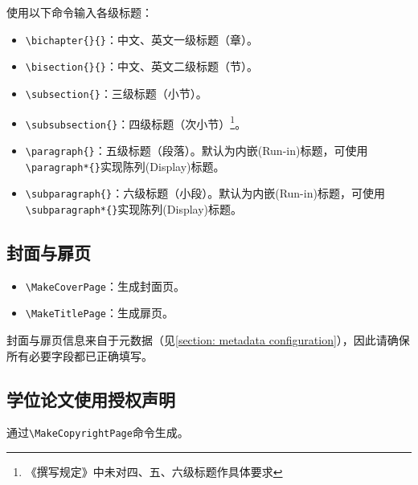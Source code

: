 使用以下命令输入各级标题：
\begin{itemize}[itemsep=2pt,topsep=5pt]
    \item \verb|\bichapter{}{}|：中文、英文一级标题（章）。
    \item \verb|\bisection{}{}|：中文、英文二级标题（节）。
    \item \verb|\subsection{}|：三级标题（小节）。
    \item \verb|\subsubsection{}|：四级标题（次小节）\footnote{《撰写规定》中未对四、五、六级标题作具体要求}。
    \item \verb|\paragraph{}|：五级标题（段落）。默认为内嵌(Run-in)标题，可使用\verb|\paragraph*{}|实现陈列(Display)标题。
    \item \verb|\subparagraph{}|：六级标题（小段）。默认为内嵌(Run-in)标题，可使用\verb|\subparagraph*{}|实现陈列(Display)标题。
\end{itemize}


\subsection{封面与扉页}
\begin{itemize}[itemsep=2pt,topsep=5pt]
    \item \verb|\MakeCoverPage|：生成封面页。
    \item \verb|\MakeTitlePage|：生成扉页。
\end{itemize}

封面与扉页信息来自于元数据（见\ref{section: metadata configuration}），因此请确保所有必要字段都已正确填写。

\subsection{学位论文使用授权声明}
通过\verb|\MakeCopyrightPage|命令生成。

